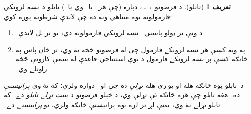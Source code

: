 \documentclass[12pt,a4paper,oneside]{report}
\theoremstyle{definition}
\newtheorem{defn}[thm]{تعريف}
\begin{document}
\label{olpseg:OLP-0102-B007:start}
\begin{defn}[تابلو]
د فرضونو~، \dots،
 دپاره (چې هر~ يا~\LR{$\True$} وي
يا~\LR{$\False$}) تابلو د~نښه لرونکي فارمولونه يوه متناهي ونه
ده چې لاندې شرطونه پوره کوي:
\begin{enumerate}
\item د ونې تر ټولو پاسني ~نښه لرونکي فارمولونه
   دي، يو تر بل لاندې۔
\item په ونه کښې هر نښه لرونکے فارمول چې له فرضونو څخه نۀ وي، تر
  ځان پاس په څانګه کښې پر نښه لرونکے فارمول د يوې استنتاجي قاعدې
  له سمې کارونې څخه راوتلے وي۔
\end{enumerate}
د~تابلو يوه څانګه هله او يوازې هله \emph{تړلې} ده چې
 او~ دواړه ولري؛ که نۀ وي
\emph{پرانيستې} ده۔ هغه تابلو چې هره څانګه ئې تړلې وي، د
خپلو فرضونو د سټ \emph{تړلے تابلو} دے۔ که تابلو تړلے
نۀ وي، يعنې لږ تر لږه يوه پرانيستې څانګه ولري، نو \emph{پرانيستے}
دے۔
\end{defn}
\label{olpseg:OLP-0102-B007:end}
\end{document}
